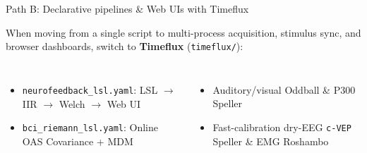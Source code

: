 \documentclass[aspectratio=169,11pt,t]{beamer}
\begin{document}
\begin{frame}{Path B: Declarative pipelines \& Web UIs with Timeflux}
  {\NTXSans\scriptsize\color{NTXMuted}When moving from a single script to multi-process acquisition, stimulus sync, and browser dashboards, switch to \textbf{Timeflux} (\texttt{timeflux/}):\par}
  \begin{columns}[T,onlytextwidth]
      \begin{itemize}\scriptsize\color{NTXInk}
        \item \texttt{neurofeedback\_lsl.yaml}: LSL $\rightarrow$ IIR $\rightarrow$ Welch $\rightarrow$ Web UI
        \item \texttt{bci\_riemann\_lsl.yaml}: Online OAS Covariance + MDM
      \end{itemize}
      \begin{itemize}\scriptsize\color{NTXInk}
        \item Auditory/visual Oddball \& P300 Speller
        \item Fast-calibration dry-EEG \texttt{c-VEP} Speller \& EMG Roshambo
      \end{itemize}
  \end{columns}
\end{frame}
\end{document}
